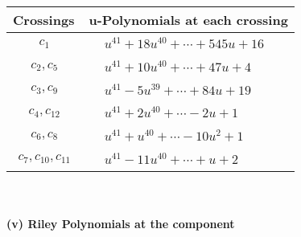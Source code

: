 \documentclass[1p]{elsarticle_modified}
\theoremstyle{definition}
\begin{document}
\begin{tabular}{m{50pt}|m{274pt}}
Crossings & \hspace{64pt}u-Polynomials at each crossing \\
\hline $$\begin{aligned}c_{1}\end{aligned}$$&$\begin{aligned}
&u^{41}+18 u^{40}+\cdots+545 u+16
\end{aligned}$\\
\hline $$\begin{aligned}c_{2},c_{5}\end{aligned}$$&$\begin{aligned}
&u^{41}+10 u^{40}+\cdots+47 u+4
\end{aligned}$\\
\hline $$\begin{aligned}c_{3},c_{9}\end{aligned}$$&$\begin{aligned}
&u^{41}-5 u^{39}+\cdots+84 u+19
\end{aligned}$\\
\hline $$\begin{aligned}c_{4},c_{12}\end{aligned}$$&$\begin{aligned}
&u^{41}+2 u^{40}+\cdots-2 u+1
\end{aligned}$\\
\hline $$\begin{aligned}c_{6},c_{8}\end{aligned}$$&$\begin{aligned}
&u^{41}+u^{40}+\cdots-10 u^2+1
\end{aligned}$\\
\hline $$\begin{aligned}c_{7},c_{10},c_{11}\end{aligned}$$&$\begin{aligned}
&u^{41}-11 u^{40}+\cdots+u+2
\end{aligned}$\\
\hline
\end{tabular}\\~\\
\newpage\renewcommand{\arraystretch}{1}
\flushleft \textbf{(v) Riley Polynomials at the component}\newline \\
\end{document}
